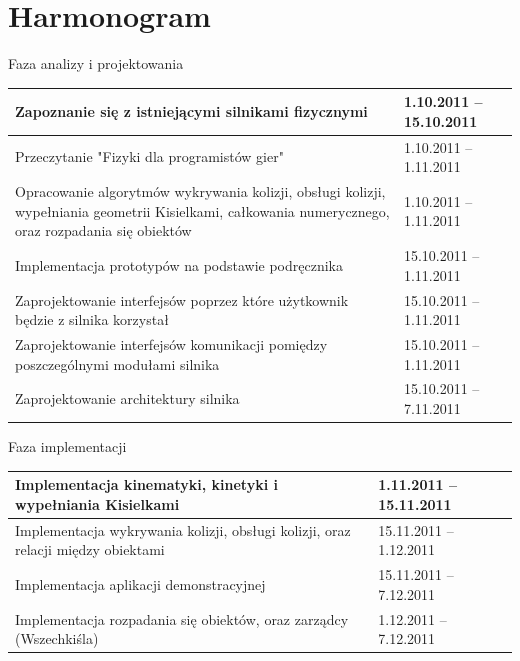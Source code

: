 \newpage
\section{Harmonogram}
	Faza analizy i projektowania
	\begin{longtable}{|p{85mm}|p{42mm}|} \hline
	
    Zapoznanie się z istniejącymi silnikami fizycznymi &
    1.10.2011 -- 15.10.2011
    \\ \hline
    
    Przeczytanie "Fizyki dla programistów gier"\cite{pfgd} &
    1.10.2011 -- 1.11.2011
    \\ \hline
    
    Opracowanie algorytmów wykrywania kolizji, obsługi kolizji, wypełniania
    geometrii Kisielkami, całkowania numerycznego, oraz rozpadania się obiektów
    & 1.10.2011 -- 1.11.2011
    \\ \hline
    
    Implementacja prototypów na podstawie podręcznika\cite{pfgd} &
    15.10.2011 -- 1.11.2011
    \\ \hline
    
    Zaprojektowanie interfejsów poprzez które użytkownik będzie z silnika
    korzystał & 15.10.2011 -- 1.11.2011
    \\ \hline
    
    Zaprojektowanie interfejsów komunikacji pomiędzy poszczególnymi modułami
    silnika & 15.10.2011 -- 1.11.2011
    \\ \hline
    
    Zaprojektowanie architektury silnika &
    15.10.2011 -- 7.11.2011
    \\ \hline
    
	\end{longtable}
	
	Faza implementacji
	\begin{longtable}{|p{85mm}|p{42mm}|} \hline
	
    Implementacja kinematyki, kinetyki i wypełniania Kisielkami &
    1.11.2011 -- 15.11.2011
    \\ \hline
	
    Implementacja wykrywania kolizji, obsługi kolizji, oraz relacji między
    obiektami & 15.11.2011 -- 1.12.2011
    \\ \hline
	
    Implementacja aplikacji demonstracyjnej
    & 15.11.2011 -- 7.12.2011
    \\ \hline
	
    Implementacja rozpadania się obiektów, oraz zarządcy (Wszechkiśla)
    & 1.12.2011 -- 7.12.2011
    \\ \hline
    
	\end{longtable}
	
